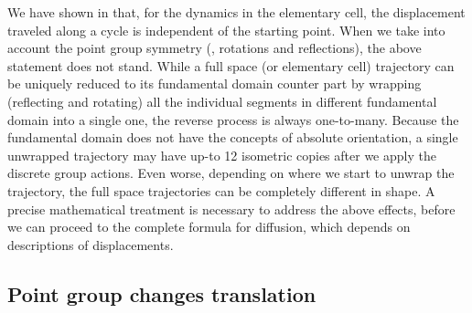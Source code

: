 We have shown in  that, for the
dynamics in the elementary cell, the displacement traveled along a
cycle is independent of the starting point. When we take into account
the point group symmetry (\ie, rotations and reflections), the above
statement does  not stand. While a full space (or elementary cell)
trajectory can be uniquely reduced to its fundamental domain counter
part by wrapping (reflecting and rotating) all the individual segments
in different fundamental domain into a single one, the reverse process
is always one-to-many. Because the fundamental domain does not have the
concepts of absolute orientation, a single unwrapped trajectory may
have up-to 12 isometric copies after we apply the discrete group
actions. Even worse, depending on where we start to unwrap the
trajectory, the full space trajectories can be completely different in
shape. A precise mathematical treatment is necessary to address the
above effects, before we can proceed to the complete formula for
diffusion, which depends on descriptions of displacements.




\subsection{Point group changes translation \label{s-FundTranslation}}

